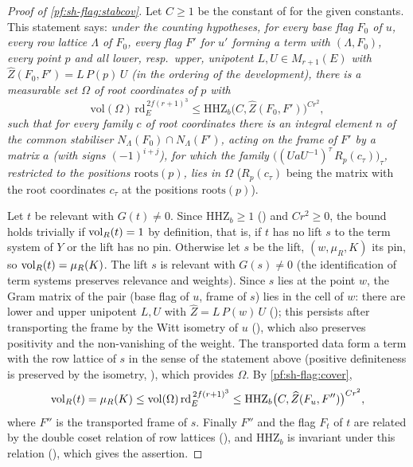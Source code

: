 \begin{proof}[Proof of \cref{pf:sh-flag:stabcov}]
Let $C\ge1$ be the constant of  for the given
constants. This statement says: \emph{under the counting hypotheses, for every base flag $F_0$ of $u$, every row lattice
$\Lambda$ of $F_0$, every flag $F'$ for $u'$ forming a term with $(\Lambda,F_0)$, every point $p$ and all lower, resp.\ upper,
unipotent $L,U\in M_{r+1}(E)$ with $\widehat Z(F_0,F')=L\,P(p)\,U$ (in the ordering of the development), there is a measurable set
$\Omega$ of root coordinates of $p$ with}
\[
\mathrm{vol}(\Omega)\,\mathrm{rd}_E^{\,2f(r+1)^3}\le\mathrm{HHZ}_b\bigl(C,\widehat Z(F_0,F')\bigr)^{Cr^2},
\]
\emph{such that for every family $c$ of root coordinates there is an integral element $n$ of the common stabiliser
$N_\Lambda(F_0)\cap N_\Lambda(F')$, acting on the frame of $F'$ by a matrix $a$ (with signs $(-1)^{i+j}$), for which the family
$\bigl((UaU^{-1})^\tau\,R_p(c_\tau)\bigr)_\tau$, restricted to the positions $\mathrm{roots}(p)$, lies in $\Omega$} ($R_p(c_\tau)$ being
the matrix with the root coordinates $c_\tau$ at the positions $\mathrm{roots}(p)$).

Let $t$ be relevant with $G(t)\ne0$. Since $\mathrm{HHZ}_b\ge1$ ()
and $Cr^2\ge0$, the bound holds trivially if $\operatorname{vol}_R(t)=1$ by definition, that is, if $t$ has no lift $s$ to the term
system of $Y$ or the lift has no pin. Otherwise let $s$ be the lift, $(w,\mu_R,K)$ its pin, so
$\operatorname{vol}_R(t)=\mu_R(K)$. The lift $s$ is relevant with $G(s)\ne0$ (the identification of term systems preserves
relevance and weights). Since $s$ lies at the point $w$, the Gram matrix of the pair (base flag of $u$, frame of $s$) lies
in the cell of $w$: there are lower and upper unipotent $L,U$ with $\widehat Z=L\,P(w)\,U$
(); this persists after transporting the frame by the Witt isometry of $u$
(), which also preserves positivity and the non-vanishing of the weight. The
transported data form a term with the row lattice of $s$ in the sense of the statement above (positive definiteness is
preserved by the isometry, ), which provides $\Omega$. By
\cref{pf:sh-flag:cover},
\[
\operatorname{vol}_R(t)=\mu_R(K)\le\mathrm{vol}(\Omega)\,\mathrm{rd}_E^{\,2f(r+1)^3}\le\mathrm{HHZ}_b\bigl(C,\widehat Z(F_u,F'')\bigr)^{Cr^2},
\]
where $F''$ is the transported frame of $s$. Finally $F''$ and the flag $F_t$ of $t$ are related by the double coset relation
of row lattices (), and $\mathrm{HHZ}_b$ is invariant under this relation
(), which gives the assertion.
\end{proof}

